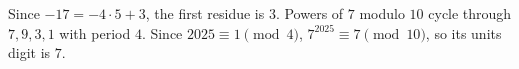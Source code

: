 Since $-17=-4\cdot 5+3$, the first residue is $\boxed 3$. Powers of $7$ modulo $10$ cycle through $7,9,3,1$ with period $4$. Since $2025\equiv 1\pmod 4$, $7^{2025}\equiv 7\pmod{10}$, so its units digit is $\boxed 7$.
